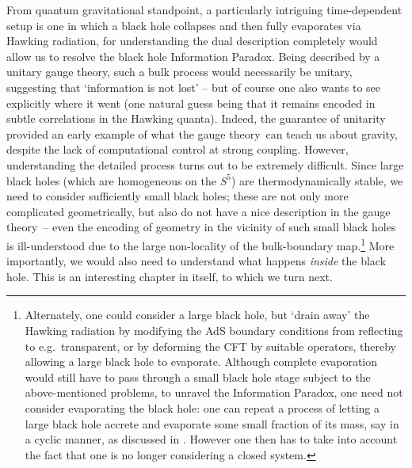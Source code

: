 \documentclass[12pt]{article}
\def\GT{gauge theory}
\begin{document}
From quantum gravitational standpoint, a particularly intriguing time-dependent setup is one in which a black hole collapses and then fully evaporates via Hawking radiation, for understanding the dual description completely would allow us to resolve the black hole Information Paradox.  Being described by a unitary \GT, such a bulk process would necessarily be unitary, suggesting that `information is not lost' -- but of course one also wants to see explicitly where it went (one natural guess being that it remains encoded in subtle correlations in the Hawking quanta).
  Indeed, the guarantee of unitarity provided an early example of what the \GT\ can teach us about gravity, despite the lack of computational control at strong coupling.  However, understanding the detailed process turns out to be extremely difficult.
  Since large black holes (which are homogeneous on the $S^5$) are thermodynamically stable, we need to consider sufficiently small black holes; these are not only more complicated geometrically, but also do not have a nice description in the \GT\ -- even the encoding of geometry in the vicinity of such small black holes is ill-understood due to the large non-locality of the bulk-boundary map.\footnote{
Alternately, one could consider a large black hole, but `drain away' the Hawking radiation by modifying the AdS boundary conditions from reflecting to e.g.\ transparent, or by deforming the CFT by suitable operators, thereby allowing a large black hole to evaporate. Although complete evaporation would still have to pass through a small black hole stage subject to the above-mentioned problems, to unravel the Information Paradox, one need not consider evaporating the black hole:
one can repeat a process of letting a large black hole accrete and evaporate some small fraction of its mass, say in a cyclic manner, as discussed in \cite{Marolf:2008tx}.
 However one then has to take into account the fact that one is no longer considering a closed system. 
}
  More importantly, we would also need to understand what happens {\it inside} the black hole.  This is an interesting chapter in itself, to which we turn next.
  
\end{document}
